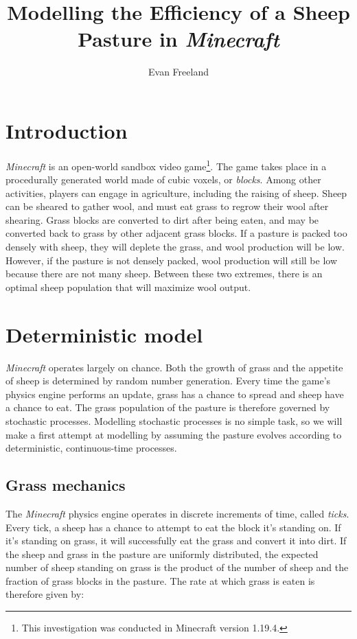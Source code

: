 \documentclass{article}
\title{Modelling the Efficiency of a Sheep Pasture in \textit{Minecraft}}
\author{Evan Freeland}
\begin{document}
\maketitle
\section{Introduction}

\textit{Minecraft} is an open-world sandbox video game\footnote{This investigation was conducted in Minecraft version 1.19.4.}. The game takes place in a procedurally generated world made of cubic voxels, or \textit{blocks}. Among other activities, players can engage in agriculture, including the raising of sheep. Sheep can be sheared to gather wool, and must eat grass to regrow their wool after shearing. Grass blocks are converted to dirt after being eaten, and may be converted back to grass by other adjacent grass blocks. If a pasture is packed too densely with sheep, they will deplete the grass, and wool production will be low. However, if the pasture is not densely packed, wool production will still be low because there are not many sheep. Between these two extremes, there is an optimal sheep population that will maximize wool output.

\section{Deterministic model}

\textit{Minecraft} operates largely on chance. Both the growth of grass and the appetite of sheep is determined by random number generation. Every time the game's physics engine performs an update, grass has a chance to spread and sheep have a chance to eat. The grass population of the pasture is therefore governed by stochastic processes. Modelling stochastic processes is no simple task, so we will make a first attempt at modelling by assuming the pasture evolves according to deterministic, continuous-time processes.

\subsection{Grass mechanics}

The \textit{Minecraft} physics engine operates in discrete increments of time, called \textit{ticks}. Every tick, a sheep has a chance to attempt to eat the block it's standing on. If it's standing on grass, it will successfully eat the grass and convert it into dirt. If the sheep and grass in the pasture are uniformly distributed, the expected number of sheep standing on grass is the product of the number of sheep and the fraction of grass blocks in the pasture. The rate at which grass is eaten is therefore given by:
\end{document}
